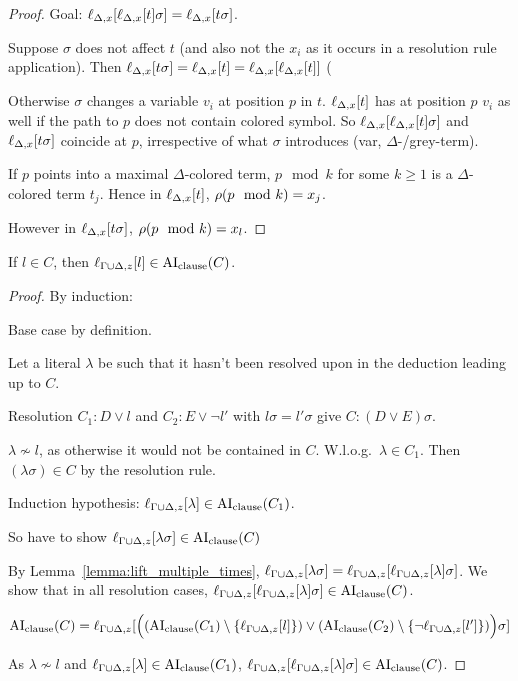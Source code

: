 \documentclass[,%
	paper=a4,%
	DIV14, 
	liststotoc,
	bibtotoc,
	draft=false,%
	numbers=noendperiod
]{scrartcl}
\begin{document}
\begin{proof}
{	Goal: $\ell_{\Delta,x}[\ell_{\Delta,x}[t] \sigma] = \ell_{\Delta,x}[t\sigma]$.

	Suppose $\sigma$ does not affect $t$ (and also not the $x_i$ as it occurs in a resolution rule application). 
	Then $\ell_{\Delta,x}[t\sigma] = \ell_{\Delta,x}[t] = \ell_{\Delta,x}[\ell_{\Delta,x}[t]]$ (

	Otherwise $\sigma$ changes a variable $v_i$ at position $p$ in $t$.
	$\ell_{\Delta,x}[t]$ has at position $p$ $v_i$ as well if the path to $p$ does not contain colored symbol.
	So $\ell_{\Delta,x}[\ell_{\Delta,x}[t]\sigma]$ and $\ell_{\Delta,x}[t\sigma]$ coincide at $p$, irrespective of what $\sigma$ introduces (var, $\Delta$-/grey-term).

	If $p$ points into a maximal $\Delta$-colored term, $p\mod k$ for some $k\geq 1$ is a $\Delta$-colored term $t_j$.
	Hence in $\ell_{\Delta,x}[t]$, $\operatorname{{\rho}}(p\mod k) = x_j$.

	However in $\ell_{\Delta,x}[t\sigma]$, $\operatorname{{\rho}}(p\mod k) = x_l$.
}
\end{proof}

\begin{lemma}

	If $l \in C$, then $\ell_{\Gamma\cup\Delta,z}[l] \in \operatorname{AI}_\mathrm{clause}(C)$.
	\label{lemma:literals_in_aiclause}
\end{lemma}
\begin{proof} By induction:

	Base case by definition.

	Let a literal $\lambda$ be such that it hasn't been resolved upon in the deduction leading up to $C$.
	
	Resolution $C_1 : D \lor l$ and $C_2 : E \lor \lnot l'$ with $l\sigma = l'\sigma$ give $C: (D\lor E)\sigma$.

	$\lambda \not\sim l$, as otherwise it would not be contained in $C$.
	W.l.o.g.\ $\lambda \in C_1$.
	Then $(\lambda\sigma) \in C$ by the resolution rule.
	
	Induction hypothesis: $\ell_{\Gamma\cup\Delta,z}[\lambda] \in \operatorname{AI}_\mathrm{clause}(C_1)$.

	So have to show $ \ell_{\Gamma\cup\Delta,z}[\lambda\sigma] \in \operatorname{AI}_\mathrm{clause}(C)$ 

	By Lemma~\ref{lemma:lift_multiple_times}, 
	$\ell_{\Gamma\cup\Delta,z}[\lambda\sigma] = \ell_{\Gamma\cup\Delta,z}[\ell_{\Gamma\cup\Delta,z}[\lambda]\sigma]$.
	We show that in all resolution cases, $\ell_{\Gamma\cup\Delta,z}[\ell_{\Gamma\cup\Delta,z}[\lambda] \sigma] \in \operatorname{AI}_\mathrm{clause}(C)$.

			$\operatorname{AI}_\mathrm{clause}(C) = \ell_{\Gamma\cup\Delta,z}[ \Big( (\operatorname{AI}_\mathrm{clause}(C_1) \setminus \{\ell_{\Gamma\cup\Delta,z}[l]\}) \lor (\operatorname{AI}_\mathrm{clause}(C_2) \setminus \{\lnot \ell_{\Gamma\cup\Delta,z}[l']\}) \Big) \sigma] $

			As $\lambda \not\sim l$ and $\ell_{\Gamma\cup\Delta,z}[\lambda] \in \operatorname{AI}_\mathrm{clause}(C_1)$, $\ell_{\Gamma\cup\Delta,z}[\ell_{\Gamma\cup\Delta,z}[\lambda] \sigma] \in \operatorname{AI}_\mathrm{clause}(C) $.
\end{proof}
\end{document}
